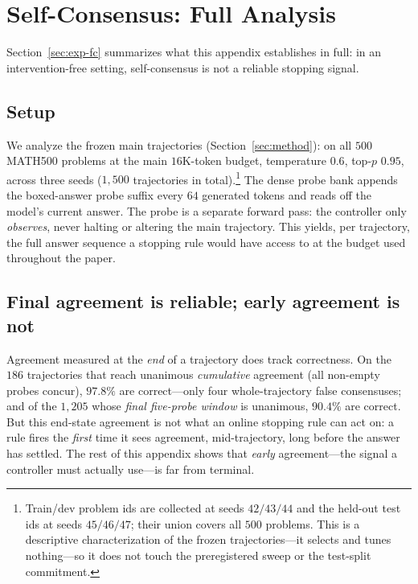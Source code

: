 \section{Self-Consensus: Full Analysis}
\label{sec:appendix-fc}

Section~\ref{sec:exp-fc} summarizes what this appendix
establishes in full: in an intervention-free setting, self-consensus is not a
reliable stopping signal.

\subsection{Setup}
\label{sec:fc-setup}
We analyze the frozen main trajectories (Section~\ref{sec:method}): \dsseven{} on
all $500$ \textsc{MATH}500 problems \citep{lightman2024verify,hendrycks2021math}
at the main $16$K-token budget, temperature $0.6$, top-$p$ $0.95$, across three
seeds ($1{,}500$ trajectories in total).\footnote{Train/dev problem ids are
collected at seeds $42/43/44$ and the held-out test ids at seeds $45/46/47$;
their union covers all $500$ problems. This is a descriptive characterization of
the frozen trajectories---it selects and tunes nothing---so it does not touch the
preregistered sweep or the test-split commitment.} The dense probe bank appends
the boxed-answer probe suffix every $64$ generated tokens and reads off the
model's current answer. The probe is a separate forward pass: the controller only
\emph{observes}, never halting or altering the main trajectory. This yields, per
trajectory, the full answer sequence a stopping rule would have access to at the
budget used throughout the paper.

\subsection{Final agreement is reliable; early agreement is not}
Agreement measured at the \emph{end} of a trajectory does track correctness.
On the $186$ trajectories that reach unanimous \emph{cumulative} agreement (all
non-empty probes concur), $97.8\%$ are correct---only four whole-trajectory false
consensuses; and of the $1{,}205$ whose \emph{final five-probe window} is
unanimous, $90.4\%$ are correct. But this end-state agreement is not what an
online stopping rule can act on: a rule fires the \emph{first} time it sees
agreement, mid-trajectory, long before the answer has settled. The rest of this
appendix shows that \emph{early} agreement---the signal a controller must
actually use---is far from terminal.

